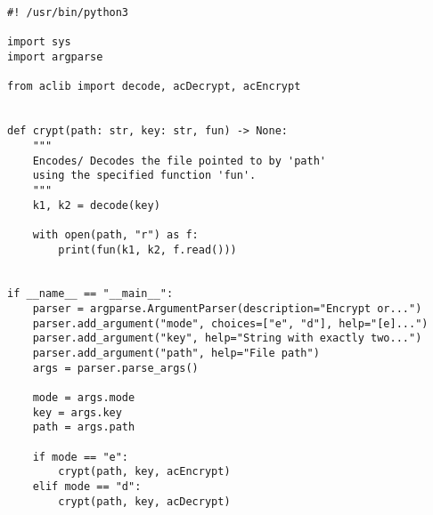 \documentclass[12pt]{article}
\begin{document}
\begin{lstlisting}
#! /usr/bin/python3

import sys 
import argparse

from aclib import decode, acDecrypt, acEncrypt


def crypt(path: str, key: str, fun) -> None:
    """ 
    Encodes/ Decodes the file pointed to by 'path'
    using the specified function 'fun'.
    """
    k1, k2 = decode(key)

    with open(path, "r") as f:
        print(fun(k1, k2, f.read()))


if __name__ == "__main__":
    parser = argparse.ArgumentParser(description="Encrypt or...")
    parser.add_argument("mode", choices=["e", "d"], help="[e]...")
    parser.add_argument("key", help="String with exactly two...")
    parser.add_argument("path", help="File path")
    args = parser.parse_args()

    mode = args.mode
    key = args.key
    path = args.path
    
    if mode == "e":
        crypt(path, key, acEncrypt)
    elif mode == "d":
        crypt(path, key, acDecrypt)

\end{lstlisting}
\end{document}
